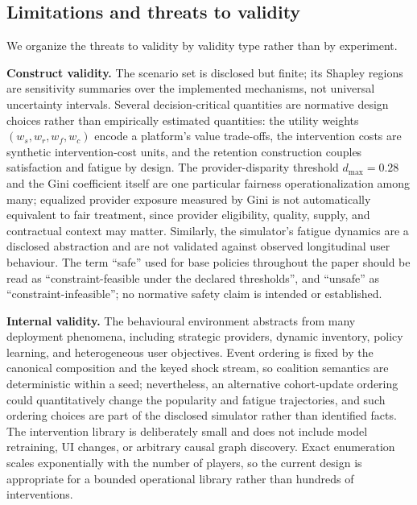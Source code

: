 \documentclass[pdflatex,sn-mathphys-num]{sn-jnl}
\theoremstyle{thmstyleone}
\theoremstyle{thmstyletwo}
\theoremstyle{thmstylethree}
\begin{document}
\subsection{Limitations and threats to validity}\label{sec:limitations}

We organize the threats to validity by validity type rather than by experiment.

\textbf{Construct validity.} The scenario set is disclosed but finite; its Shapley regions are sensitivity summaries over the implemented mechanisms, not universal uncertainty intervals. Several decision-critical quantities are normative design choices rather than empirically estimated quantities: the utility weights $(w_s,w_r,w_f,w_c)$ encode a platform's value trade-offs, the intervention costs are synthetic intervention-cost units, and the retention construction couples satisfaction and fatigue by design. The provider-disparity threshold $d_{\max}=0.28$ and the Gini coefficient itself are one particular fairness operationalization among many; equalized provider exposure measured by Gini is not automatically equivalent to fair treatment, since provider eligibility, quality, supply, and contractual context may matter. Similarly, the simulator's fatigue dynamics are a disclosed abstraction and are not validated against observed longitudinal user behaviour. The term ``safe'' used for base policies throughout the paper should be read as ``constraint-feasible under the declared thresholds'', and ``unsafe'' as ``constraint-infeasible''; no normative safety claim is intended or established.

\textbf{Internal validity.} The behavioural environment abstracts from many deployment phenomena, including strategic providers, dynamic inventory, policy learning, and heterogeneous user objectives. Event ordering is fixed by the canonical composition and the keyed shock stream, so coalition semantics are deterministic within a seed; nevertheless, an alternative cohort-update ordering could quantitatively change the popularity and fatigue trajectories, and such ordering choices are part of the disclosed simulator rather than identified facts. The intervention library is deliberately small and does not include model retraining, UI changes, or arbitrary causal graph discovery. Exact enumeration scales exponentially with the number of players, so the current design is appropriate for a bounded operational library rather than hundreds of interventions.
\end{document}
